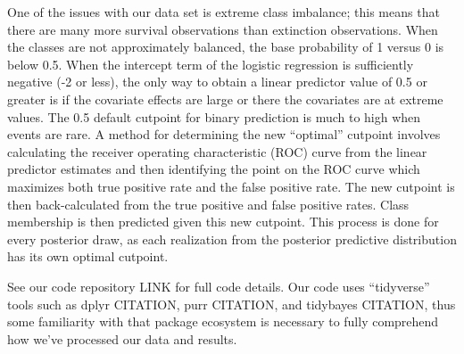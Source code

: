 \documentclass[12pt,letterpaper]{article}
\begin{document}
One of the issues with our data set is extreme class imbalance; this means that there are many more survival observations than extinction observations. When the classes are not approximately balanced, the base probability of 1 versus 0 is below 0.5. When the intercept term of the logistic regression is sufficiently negative (-2 or less), the only way to obtain a linear predictor value of 0.5 or greater is if the covariate effects are large or there the covariates are at extreme values. The 0.5 default cutpoint for binary prediction is much to high when events are rare. A method for determining the new ``optimal'' cutpoint involves calculating the receiver operating characteristic (ROC) curve from the linear predictor estimates and then identifying the point on the ROC curve which maximizes both true positive rate and the false positive rate. The new cutpoint is then back-calculated from the true positive and false positive rates. Class membership is then predicted given this new cutpoint. This process is done for every posterior draw, as each realization from the posterior predictive distribution has its own optimal cutpoint.

See our code repository LINK for full code details. Our code uses ``tidyverse'' tools such as dplyr CITATION, purr CITATION, and tidybayes CITATION, thus some familiarity with that package ecosystem is necessary to fully comprehend how we've processed our data and results.
\end{document}
